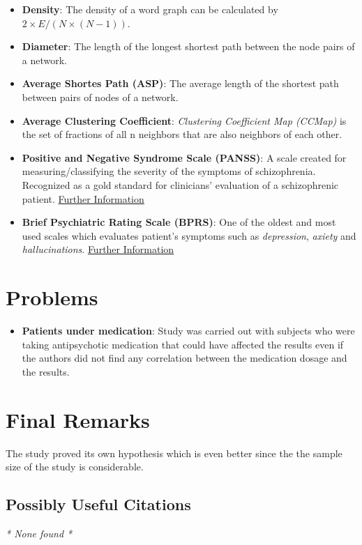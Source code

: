 \documentclass{Paper_Summary}
\begin{document}
\begin{itemize}
        \item \textbf{Density}: The density of a word graph can be calculated by \(2 \times E / (N \times (N - 1))\).
        \item \textbf{Diameter}: The length of the longest shortest path between the node pairs of a network.
        \item \textbf{Average Shortes Path (ASP)}: The average length of the shortest path between pairs of nodes of a network.
        \item \textbf{Average Clustering Coefficient}: \emph{Clustering Coefficient Map (CCMap)} is the set of fractions of all n neighbors that are also neighbors of each other.
        \item \textbf{Positive and Negative Syndrome Scale (PANSS)}: A scale created for measuring/classifying the severity of the symptoms of schizophrenia. Recognized as a gold standard for clinicians' evaluation of a schizophrenic patient. \href{https://en.wikipedia.org/wiki/Positive_and_Negative_Syndrome_Scale}{Further Information}
        \item \textbf{Brief Psychiatric Rating Scale (BPRS)}: One of the oldest and most used scales which evaluates patient's symptoms such as \emph{depression}, \emph{axiety} and \emph{hallucinations}. \href{https://en.wikipedia.org/wiki/Brief_Psychiatric_Rating_Scale}{Further Information}
    \end{itemize}

\section{Problems}
    \begin{itemize}
        \item \textbf{Patients under medication}: Study was carried out with subjects who were taking antipsychotic medication that could have affected the results even if the authors did not find any correlation between the medication dosage and the results.
    \end{itemize}


\section{Final Remarks}

    The study proved its own hypothesis which is even better since the the sample size of the study is considerable.

\breakline

\begin{center}
    \section*{Possibly Useful Citations}
\end{center}
\emph{* None found *}
\end{document}
